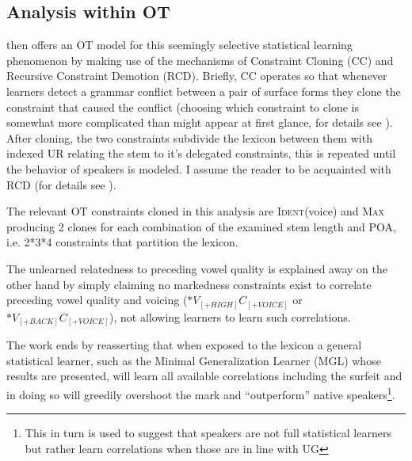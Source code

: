 \documentclass[a4paper,12pt]{article}
\begin{document}
\subsection{Analysis within OT}
\cite{becker_phonological_2009} then offers an OT model for this seemingly selective statistical
learning phenomenon by making use of the mechanisms of Constraint Cloning (CC) and Recursive
Constraint Demotion (RCD). Briefly, CC operates so that whenever learners detect a grammar conflict
between a pair of surface forms they clone the constraint that caused the conflict (choosing which
constraint to clone is somewhat more complicated than might appear at first glance, for details
see \cite{pater_locus_2007}). After cloning, the two constraints subdivide the lexicon between them
with indexed UR relating the stem to it's delegated constraints, this is repeated until the
behavior of speakers is modeled. I assume the reader to be acquainted with RCD (for details see
\cite{tesar_multi_recursive_1997}).

The relevant OT constraints cloned in this analysis are \textsc{Ident}(voice) and \textsc{Max}
producing 2 clones for each combination of the examined stem length and POA, i.e. 2*3*4 constraints
that partition the lexicon.

The unlearned relatedness to preceding vowel quality is explained away on the other hand by simply
claiming no markedness constraints exist to correlate preceding vowel quality and voicing
(${*V_{[+HIGH]}C_{[+VOICE]}}$ or ${*V_{[+BACK]}C_{[+VOICE]}}$), not allowing learners to learn such
correlations.

The work ends by reasserting that when exposed to the lexicon a general statistical learner, such as
the Minimal Generalization Learner (MGL) whose results are presented, will learn all available
correlations including the surfeit and in doing so will greedily overshoot the mark and
``outperform'' native speakers\footnote{This in turn is used to suggest that speakers are not full
statistical learners but rather learn correlations when those are in line with UG}.
\end{document}
